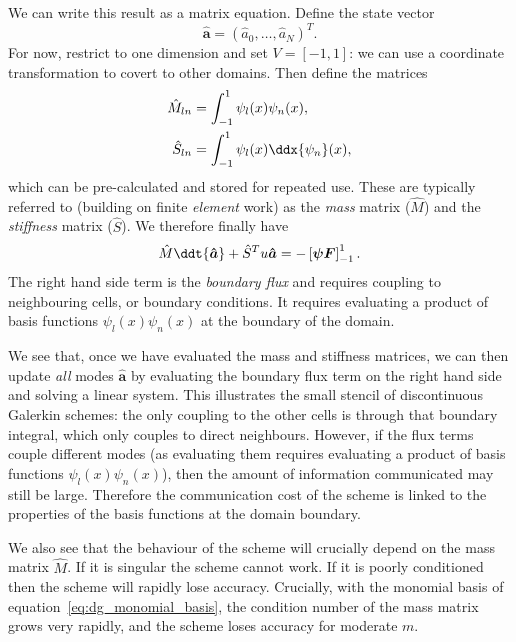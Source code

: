 We can write this result as a matrix equation. Define the state vector
%
\begin{equation}
  \label{eq:dg_state_vector}
  \bm{\hat{a}} = (\hat{a}_0, \dots, \hat{a}_N)^T.
\end{equation}
%
For now, restrict to one dimension and set $V = [-1, 1]$: we can use a
coordinate transformation to covert to other domains. Then define the matrices
%
\begin{align}
  \label{eq:dg_mass_matrix}
  \hat{M}_{ln} &= \int_{-1}^1 \psi_l(x) \psi_n(x), \\
  \label{eq:dg_stiffness_matrix}
  \hat{S}_{ln} &= \int_{-1}^1 \psi_l(x) \ddx{\psi_n}(x),
\end{align}
%
which can be pre-calculated and stored for repeated use. These are typically
referred to (building on finite \emph{element} work) as the \emph{mass} matrix
($\hat{M}$) and the \emph{stiffness} matrix ($\hat{S}$). We therefore finally
have
%
\begin{equation}
  \label{eq:dg_advection5}
  \hat{M} \ddt{\bm{\hat{a}}} + \hat{S}^T u \bm{\hat{a}} = -\left[ \bm{\psi F} \right]_{-1}^1.
\end{equation}
%
The right hand side term is the \emph{boundary flux} and requires coupling to
neighbouring cells, or boundary conditions. It requires evaluating a product of
basis functions $\psi_l(x) \psi_n(x)$ at the boundary of the domain.

We see that, once we have evaluated the mass and stiffness matrices, we can then
update \emph{all} modes $\bm{\hat{a}}$ by evaluating the boundary flux term
on the right hand side and solving a linear system. This illustrates the small
stencil of discontinuous Galerkin schemes: the only coupling to the other cells
is through that boundary integral, which only couples to direct neighbours.
However, if the flux terms couple different modes (as evaluating them requires
evaluating a product of basis functions $\psi_l(x) \psi_n(x)$), then the amount
of information communicated may still be large. Therefore the communication cost
of the scheme is linked to the properties of the basis functions at the domain
boundary.

We also see that the behaviour of the scheme will crucially depend on the mass
matrix $\hat{M}$. If it is singular the scheme cannot work. If it is poorly
conditioned then the scheme will rapidly lose accuracy. Crucially, with the
monomial basis of equation~\ref{eq:dg_monomial_basis}, the condition number of
the mass matrix grows very rapidly, and the scheme loses accuracy for moderate
$m$.

